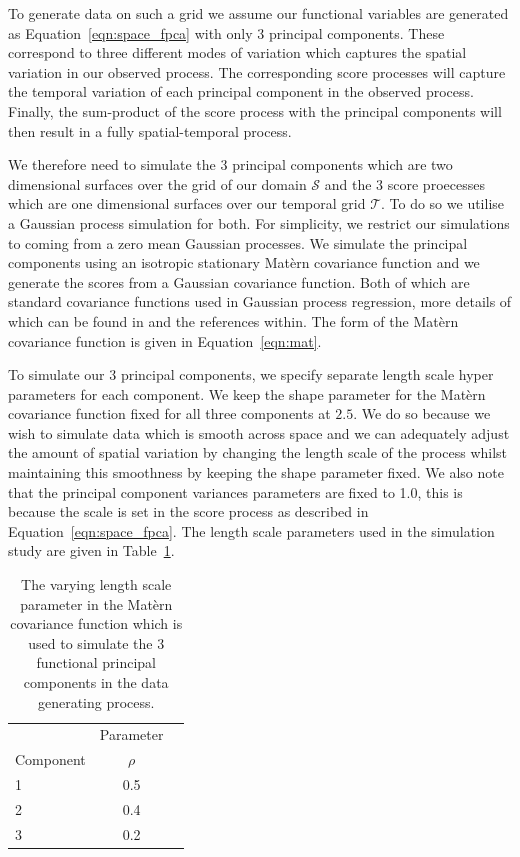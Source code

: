 To generate data on such a grid we assume our functional variables are generated as Equation~\eqref{eqn:space_fpca} with only $3$ principal components.
These correspond to three different modes of variation which captures the spatial variation in our observed process.
The corresponding score processes will capture the temporal variation of each principal component in the observed process.
Finally, the sum-product of the score process with the principal components will then result in a fully spatial-temporal process. 

We therefore need to simulate the $3$ principal components which are two dimensional surfaces over the grid of our domain $\mathcal{S}$ and the $3$ score proecesses which are one dimensional surfaces over our temporal grid $\mathcal{T}$.
To do so we utilise a Gaussian process simulation for both.
For simplicity, we restrict our simulations to coming from a zero mean Gaussian processes.
We simulate the principal components using an isotropic stationary Mat\`{e}rn covariance function and we generate the scores from a Gaussian covariance function.
Both of which are standard covariance functions used in Gaussian process regression, more details of which can be found in \citep{williams_gaussian_2006} and the references within.
The form of the Mat\`{e}rn covariance function is given in Equation~\eqref{eqn:mat}. 

To simulate our $3$ principal components, we specify separate length scale hyper parameters for each component. 
We keep the shape parameter for the Mat\`{e}rn covariance function fixed for all three components at $2.5$. 
We do so because we wish to simulate data which is smooth across space and we can adequately adjust the amount of spatial variation by changing the length scale of the process whilst maintaining this smoothness by keeping the shape parameter fixed.
We also note that the principal component variances parameters are fixed to 1.0, this is because the scale is set in the score process as described in Equation~\eqref{eqn:space_fpca}.
The length scale parameters used in the simulation study are given in Table~\ref{tab:fpc_params}.

\begin{table}[htbp!] 
	\caption[Parameters for simulating functional principal component processes.]{The varying length scale parameter in the Mat\`{e}rn covariance function which is used to simulate the $3$ functional principal components in the data generating process.}
	\centering
	\label{tab:fpc_params}
	\begin{tabular}{l c c }
		\toprule
		& \multicolumn{1}{c}{Parameter} \\ 
		Component  & $\rho$ \\
		\midrule
		1 & 0.5 \\
		2 & 0.4 \\
		3 & 0.2 \\
		\bottomrule
	\end{tabular}
\end{table}

